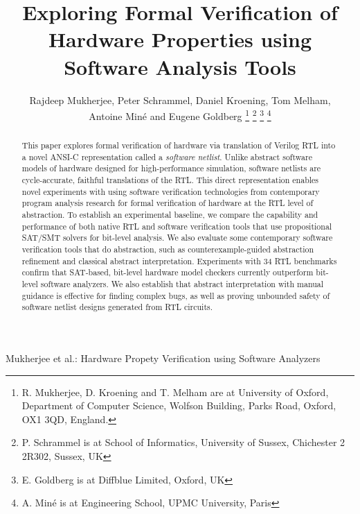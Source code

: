 \documentclass[journal]{IEEEtran}
\theoremstyle{definition}
\begin{document}
\title{Exploring Formal Verification of Hardware Properties using Software Analysis Tools}

\author{Rajdeep Mukherjee, 
        Peter Schrammel,
        Daniel Kroening, 
        Tom Melham, \\
        Antoine Min{\'e} and
        Eugene Goldberg
        \thanks{R. Mukherjee, D. Kroening and T. Melham are at 
                University of Oxford, Department of Computer Science,
                Wolfson Building, Parks Road,
                Oxford, OX1 3QD, England.}
        \thanks{P. Schrammel is at School of Informatics, University of Sussex, 
                Chichester 2 2R302, Sussex, UK}
        \thanks{E. Goldberg is at Diffblue Limited, Oxford, UK}
        \thanks{A. Min{\'e} is at Engineering School, UPMC University, Paris}}
%
         {Mukherjee et al.: Hardware Propety Verification using Software Analyzers}

\maketitle

\begin{abstract}
This paper explores formal verification of hardware via translation of Verilog RTL into a novel ANSI-C representation called a \textit{software netlist}. Unlike abstract software models of hardware designed for high-performance simulation, software netlists  are cycle-accurate, faithful translations of the RTL. This direct representation enables novel experiments with using software verification technologies from contemporary program analysis research for formal verification of hardware at the RTL level of abstraction.  To establish an experimental
baseline, we compare the capability and performance of both native RTL and software verification tools
that use propositional SAT/SMT solvers for bit-level analysis. We also evaluate some contemporary software verification tools that do abstraction, such as counterexample-guided abstraction refinement and classical abstract interpretation. Experiments with 34 RTL benchmarks confirm that SAT-based, bit-level hardware model checkers currently outperform bit-level software analyzers. We also establish that abstract interpretation  with manual guidance is effective for finding complex bugs, as well as proving 
unbounded safety of software netlist designs generated from RTL circuits.  
\end{abstract}
\end{document}
